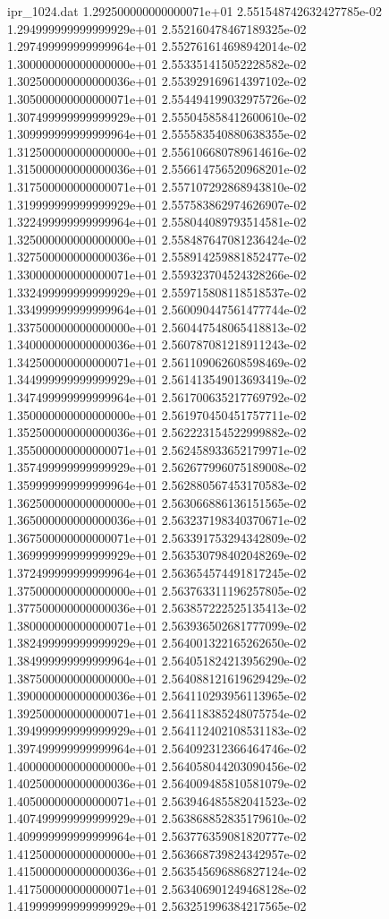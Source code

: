 \begin{filecontents}{ipr_1024.dat}
1.292500000000000071e+01 2.551548742632427785e-02
1.294999999999999929e+01 2.552160478467189325e-02
1.297499999999999964e+01 2.552761614698942014e-02
1.300000000000000000e+01 2.553351415052228582e-02
1.302500000000000036e+01 2.553929169614397102e-02
1.305000000000000071e+01 2.554494199032975726e-02
1.307499999999999929e+01 2.555045858412600610e-02
1.309999999999999964e+01 2.555583540880638355e-02
1.312500000000000000e+01 2.556106680789614616e-02
1.315000000000000036e+01 2.556614756520968201e-02
1.317500000000000071e+01 2.557107292868943810e-02
1.319999999999999929e+01 2.557583862974626907e-02
1.322499999999999964e+01 2.558044089793514581e-02
1.325000000000000000e+01 2.558487647081236424e-02
1.327500000000000036e+01 2.558914259881852477e-02
1.330000000000000071e+01 2.559323704524328266e-02
1.332499999999999929e+01 2.559715808118518537e-02
1.334999999999999964e+01 2.560090447561477744e-02
1.337500000000000000e+01 2.560447548065418813e-02
1.340000000000000036e+01 2.560787081218911243e-02
1.342500000000000071e+01 2.561109062608598469e-02
1.344999999999999929e+01 2.561413549013693419e-02
1.347499999999999964e+01 2.561700635217769792e-02
1.350000000000000000e+01 2.561970450451757711e-02
1.352500000000000036e+01 2.562223154522999882e-02
1.355000000000000071e+01 2.562458933652179971e-02
1.357499999999999929e+01 2.562677996075189008e-02
1.359999999999999964e+01 2.562880567453170583e-02
1.362500000000000000e+01 2.563066886136151565e-02
1.365000000000000036e+01 2.563237198340370671e-02
1.367500000000000071e+01 2.563391753294342809e-02
1.369999999999999929e+01 2.563530798402048269e-02
1.372499999999999964e+01 2.563654574491817245e-02
1.375000000000000000e+01 2.563763311196257805e-02
1.377500000000000036e+01 2.563857222525135413e-02
1.380000000000000071e+01 2.563936502681777099e-02
1.382499999999999929e+01 2.564001322165262650e-02
1.384999999999999964e+01 2.564051824213956290e-02
1.387500000000000000e+01 2.564088121619629429e-02
1.390000000000000036e+01 2.564110293956113965e-02
1.392500000000000071e+01 2.564118385248075754e-02
1.394999999999999929e+01 2.564112402108531183e-02
1.397499999999999964e+01 2.564092312366464746e-02
1.400000000000000000e+01 2.564058044203090456e-02
1.402500000000000036e+01 2.564009485810581079e-02
1.405000000000000071e+01 2.563946485582041523e-02
1.407499999999999929e+01 2.563868852835179610e-02
1.409999999999999964e+01 2.563776359081820777e-02
1.412500000000000000e+01 2.563668739824342957e-02
1.415000000000000036e+01 2.563545696886827124e-02
1.417500000000000071e+01 2.563406901249468128e-02
1.419999999999999929e+01 2.563251996384217565e-02

\end{filecontents}
